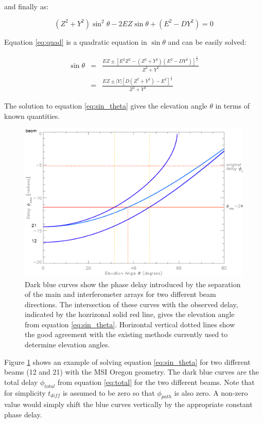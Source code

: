 \documentclass{article}
\begin{document}
\noindent
and finally as:

\begin{equation}
\left( Z^2 + Y^2 \right) \sin^2 \theta - 2 E Z \sin \theta +
	\left( E^2 - D Y^2 \right) = 0 \label{eq:quad}
\end{equation}


\noindent
Equation \ref{eq:quad} is a quadratic equation in $\sin \theta$ and can be
easily solved:

\begin{eqnarray}
\sin \theta & = & \frac{
	EZ \pm \left[ E^2 Z^2 - \left(Z^2 +Y^2\right)\left(E^2 - DY^2\right)
			\right]^\frac{1}{2}}
	{Z^2 + Y^2} \\
& = & \frac{EZ \pm \left|Y\right| \left[ D \left(Z^2 + Y^2\right) - E^2
		\right]^\frac{1}{2}}{Z^2 + Y^2} \label{eq:sin_theta}
\end{eqnarray}

\noindent
The solution to equation \ref{eq:sin_theta} gives the elevation angle $\theta$
in terms of known quantities.

\begin{figure}[tb]
\includegraphics[scale=.8]{angle_eg.ps}
\caption{Dark blue curves show the phase delay introduced by the separation
of the main and interferometer arrays for two different beam directions. The
intersection of these curves with the observed delay, indicated by the
hozrizonal solid red line, gives the elevation angle from equation
\ref{eq:sin_theta}. Horizontal vertical dotted lines show the good agreement
with the existing methods currently used to determine elevation angles.}
\label{fig:elev}
\end{figure}

\noindent
Figure \ref{fig:elev} shows an example of solving equation \ref{eq:sin_theta}
for two different beams (12 and 21) with the MSI Oregon geometry. The
dark blue curves are the total delay $\phi_{total}$ from equation
\ref{eq:total} for the two different beams. Note that for simplicity
$t_{diff}$ is assumed to be zero so that $\phi_{path}$ is also zero. A
non-zero value would simply shift the blue curves vertically by the
appropriate constant phase delay. \\
\end{document}
